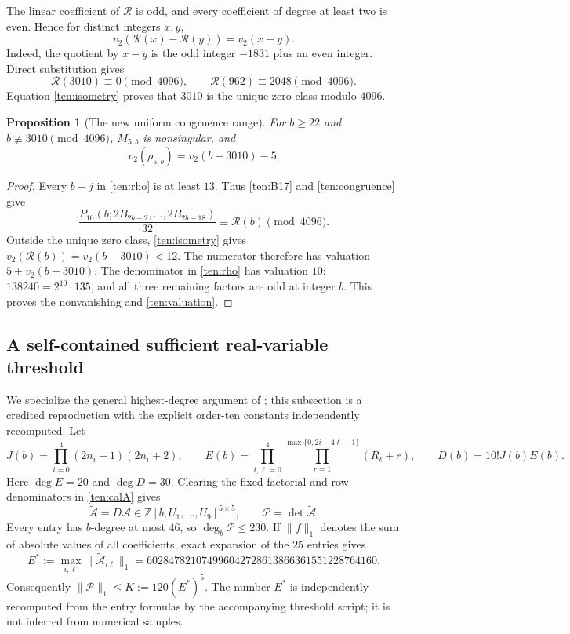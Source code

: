 \documentclass[11pt]{article}
\newtheorem{proposition}[theorem]{Proposition}
\theoremstyle{definition}
\theoremstyle{remark}
\numberwithin{equation}{section}
\begin{document}
The linear coefficient of $\mathcal R$ is odd, and every coefficient
of degree at least two is even.  Hence for distinct integers $x,y$,
\begin{equation}\label{ten:isometry}
 v_2(\mathcal R(x)-\mathcal R(y))=v_2(x-y).
\end{equation}
Indeed, the quotient by $x-y$ is the odd integer $-1831$ plus an
even integer.  Direct substitution gives
\[
 \mathcal R(3010)\equiv0\pmod{4096},\qquad
 \mathcal R(962)\equiv2048\pmod{4096}.
\]
Equation \eqref{ten:isometry} proves that $3010$ is the unique
zero class modulo $4096$.

\begin{proposition}[The new uniform congruence range]\label{ten:range}
For $b\ge22$ and $b\not\equiv3010\pmod{4096}$,
$M_{5,b}$ is nonsingular, and
\begin{equation}\label{ten:valuation}
 v_2(\rho_{5,b})=v_2(b-3010)-5.
\end{equation}
\end{proposition}
\begin{proof}
Every $b-j$ in \eqref{ten:rho} is at least $13$.  Thus
\eqref{ten:B17} and \eqref{ten:congruence} give
\[
 \frac{P_{10}(b;2B_{2b-2},\ldots,2B_{2b-18})}{32}
          \equiv\mathcal R(b)\pmod{4096}.
\]
Outside the unique zero class, \eqref{ten:isometry} gives
$v_2(\mathcal R(b))=v_2(b-3010)<12$.
The numerator therefore has valuation $5+v_2(b-3010)$.
The denominator in \eqref{ten:rho} has valuation $10$:
$138240=2^{10}\cdot135$, and all three remaining factors are odd
at integer $b$.  This proves the nonvanishing and
\eqref{ten:valuation}.
\end{proof}

\subsection{A self-contained sufficient real-variable threshold}

We specialize the general highest-degree argument of
\cite{QuarticIncoming}; this subsection is a credited reproduction
with the explicit order-ten constants independently recomputed.
Let
\[
 J(b)=\prod_{i=0}^{4}(2n_i+1)(2n_i+2),\qquad
 E(b)=\prod_{i,\ell=0}^{4}\prod_{r=1}^{\max\{0,2i-4\ell-1\}}
                  (R_\ell+r),\qquad D(b)=10!J(b)E(b).
\]
Here $\deg E=20$ and $\deg D=30$.  Clearing the fixed factorial
and row denominators in \eqref{ten:calA} gives
\[
 \widetilde{\mathcal A}=D\mathcal A
     \in\mathbb Z[b,U_1,\ldots,U_9]^{5\times5},\qquad
 \mathscr P=\det\widetilde{\mathcal A}.
\]
Every entry has $b$-degree at most $46$, so $\deg_b\mathscr P\le230$.
If $\|f\|_1$ denotes the sum of absolute values of all coefficients,
exact expansion of the $25$ entries gives
\[
 E^*:=\max_{i,\ell}\|\widetilde{\mathcal A}_{i\ell}\|_1
 =602847821074996042728613866361551228764160.
\]
Consequently $\|\mathscr P\|_1\le K:=120(E^*)^5$.
The number $E^*$ is independently recomputed from the entry formulas
by the accompanying threshold script; it is not inferred from
numerical samples.
\end{document}
